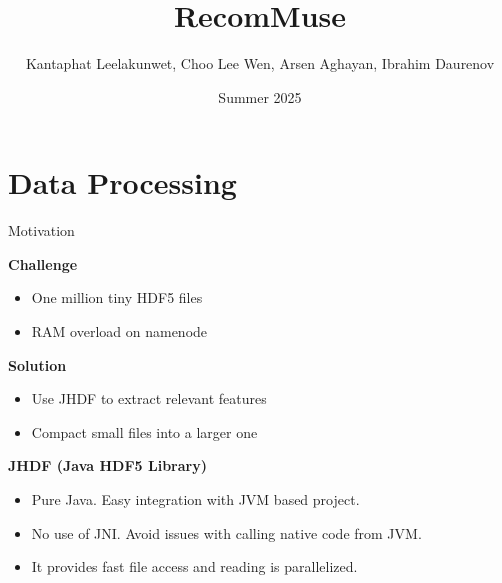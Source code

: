 \documentclass{beamer}
\title{RecomMuse}
\author{Kantaphat Leelakunwet, Choo Lee Wen, Arsen Aghayan, Ibrahim Daurenov}
\date{Summer 2025}
\begin{document}
\maketitle


    
    



    



\section{Data Processing}

\begin{frame}{Motivation}

    \textbf{Challenge}
    \begin{itemize}
        \item One million tiny HDF5 files
        \item RAM overload on namenode
    \end{itemize}
    
    \textbf{Solution}
    \begin{itemize}
        \item Use JHDF to extract relevant features
        \item Compact small files into a larger one
    \end{itemize}

    \textbf{JHDF (Java HDF5 Library)}
    \begin{itemize}
        \item Pure Java. Easy integration with JVM based project.
        \item No use of JNI. Avoid issues with calling native code from JVM.
        \item It provides fast file access and reading is parallelized.
    \end{itemize}
    
\end{frame}
\end{document}
